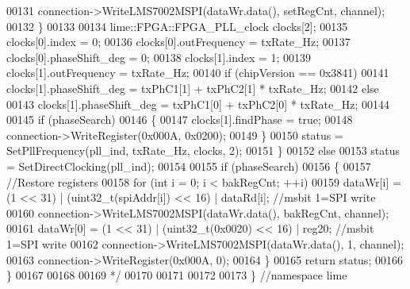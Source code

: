 \begin{DoxyCode}
00131 \textcolor{comment}{            connection->WriteLMS7002MSPI(dataWr.data(), setRegCnt, channel);}
00132 \textcolor{comment}{        \}}
00133 \textcolor{comment}{}
00134 \textcolor{comment}{        lime::FPGA::FPGA\_PLL\_clock clocks[2];}
00135 \textcolor{comment}{        clocks[0].index = 0;}
00136 \textcolor{comment}{        clocks[0].outFrequency = txRate\_Hz;}
00137 \textcolor{comment}{        clocks[0].phaseShift\_deg = 0;}
00138 \textcolor{comment}{        clocks[1].index = 1;}
00139 \textcolor{comment}{        clocks[1].outFrequency = txRate\_Hz;}
00140 \textcolor{comment}{        if (chipVersion == 0x3841)}
00141 \textcolor{comment}{            clocks[1].phaseShift\_deg = txPhC1[1] + txPhC2[1] * txRate\_Hz;}
00142 \textcolor{comment}{        else}
00143 \textcolor{comment}{            clocks[1].phaseShift\_deg = txPhC1[0] + txPhC2[0] * txRate\_Hz;}
00144 \textcolor{comment}{}
00145 \textcolor{comment}{        if (phaseSearch)}
00146 \textcolor{comment}{        \{}
00147 \textcolor{comment}{            clocks[1].findPhase = true;}
00148 \textcolor{comment}{            connection->WriteRegister(0x000A, 0x0200);}
00149 \textcolor{comment}{        \}}
00150 \textcolor{comment}{        status = SetPllFrequency(pll\_ind, txRate\_Hz, clocks, 2);}
00151 \textcolor{comment}{    \}}
00152 \textcolor{comment}{    else}
00153 \textcolor{comment}{        status = SetDirectClocking(pll\_ind);}
00154 \textcolor{comment}{}
00155 \textcolor{comment}{    if (phaseSearch)}
00156 \textcolor{comment}{    \{}
00157 \textcolor{comment}{        //Restore registers}
00158 \textcolor{comment}{        for (int i = 0; i < bakRegCnt; ++i)}
00159 \textcolor{comment}{            dataWr[i] = (1 << 31) | (uint32\_t(spiAddr[i]) << 16) | dataRd[i]; //msbit 1=SPI write}
00160 \textcolor{comment}{        connection->WriteLMS7002MSPI(dataWr.data(), bakRegCnt, channel);}
00161 \textcolor{comment}{        dataWr[0] = (1 << 31) | (uint32\_t(0x0020) << 16) | reg20; //msbit 1=SPI write}
00162 \textcolor{comment}{        connection->WriteLMS7002MSPI(dataWr.data(), 1, channel);}
00163 \textcolor{comment}{        connection->WriteRegister(0x000A, 0);}
00164 \textcolor{comment}{    \}}
00165 \textcolor{comment}{    return status;}
00166 \textcolor{comment}{\}}
00167 \textcolor{comment}{}
00168 \textcolor{comment}{}
00169 \textcolor{comment}{*/}
00170 
00171 
00172 
00173 \} \textcolor{comment}{//namespace lime}
\end{DoxyCode}
